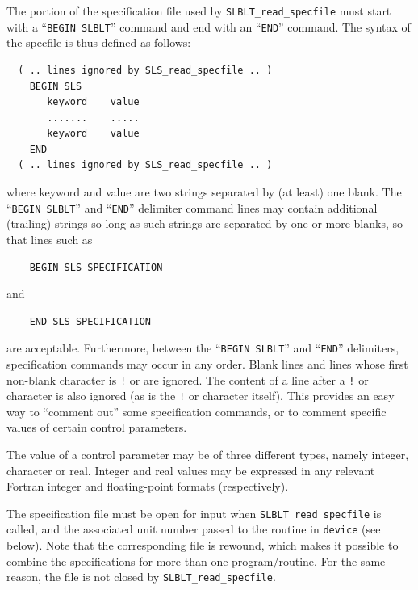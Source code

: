 \documentclass{galahad}
\newcommand{\packagename}{SLBLT}
\begin{document}
The portion of the specification file used by
{\tt \packagename\_read\_specfile}
must start
with a ``{\tt BEGIN \packagename}'' command and end with an
``{\tt END}'' command.  The syntax of the specfile is thus defined as follows:
\begin{verbatim}
  ( .. lines ignored by SLS_read_specfile .. )
    BEGIN SLS
       keyword    value
       .......    .....
       keyword    value
    END
  ( .. lines ignored by SLS_read_specfile .. )
\end{verbatim}
where keyword and value are two strings separated by (at least) one blank.
The ``{\tt BEGIN \packagename}'' and ``{\tt END}'' delimiter command lines
may contain additional (trailing) strings so long as such strings are
separated by one or more blanks, so that lines such as
\begin{verbatim}
    BEGIN SLS SPECIFICATION
\end{verbatim}
and
\begin{verbatim}
    END SLS SPECIFICATION
\end{verbatim}
are acceptable. Furthermore,
between the
``{\tt BEGIN \packagename}'' and ``{\tt END}'' delimiters,
specification commands may occur in any order.  Blank lines and
lines whose first non-blank character is {\tt !} or {\tt *} are ignored.
The content
of a line after a {\tt !} or {\tt *} character is also
ignored (as is the {\tt !} or {\tt *}
character itself). This provides an easy way to ``comment out'' some
specification commands, or to comment specific values
of certain control parameters.

The value of a control parameter may be of three different types, namely
integer, character or real.
Integer and real values may be expressed in any relevant Fortran integer and
floating-point formats (respectively).

The specification file must be open for
input when {\tt \packagename\_read\_specfile}
is called, and the associated unit number
passed to the routine in {\tt device} (see below).
Note that the corresponding
file is rewound, which makes it possible to combine the specifications
for more than one program/routine.  For the same reason, the file is not
closed by {\tt \packagename\_read\_specfile}.
\end{document}
